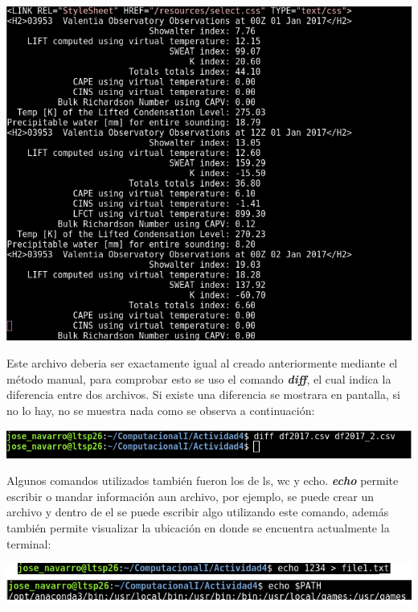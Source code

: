 \documentclass[12pt]{article}
\begin{document}
\begin{center}
\includegraphics[scale=0.55]{archnuevo.png}
\end{center} 

Este archivo deberia ser exactamente igual al creado anteriormente mediante el método manual, para comprobar esto se uso el comando \textbf{\textit{diff}}, el cual indica la diferencia entre dos archivos. Si existe una diferencia se mostrara en pantalla, si no lo hay, no se muestra nada como se observa a continuación: \\

\begin{center}
\includegraphics[scale=0.55]{diff.png}
\end{center} 

Algunos comandos utilizados también fueron los de ls, wc y echo. \textbf{\textit{echo}} permite escribir o mandar información aun archivo, por ejemplo, se puede crear un archivo y dentro de el se puede escribir algo utilizando este comando, además también permite visualizar la ubicación en donde se encuentra actualmente la terminal:

\begin{center}
\includegraphics[scale=0.55]{echo.png}
\end{center} 
\end{document}
